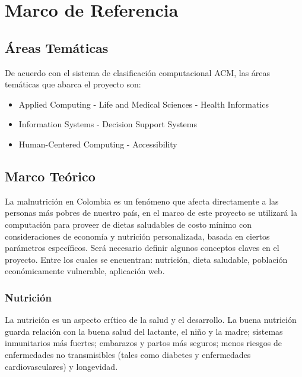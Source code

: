 \section{Marco de Referencia}
\subsection{\'Areas Tem\'aticas}

\noindent De acuerdo con el sistema de clasificaci\'on computacional ACM, las \'areas tem\'aticas que abarca el proyecto son:
\begin{itemize}
    \item  Applied Computing - Life and Medical Sciences - Health Informatics
    \item Information Systems - Decision Support Systems
    \item Human-Centered Computing - Accessibility
\end{itemize}

\subsection{Marco Te\'orico}

\noindent La malnutrici\'on en Colombia es un fen\'omeno que afecta directamente a las personas m\'as pobres de nuestro pa\'is, en el marco de este proyecto se utilizar\'a la computaci\'on para proveer de dietas saludables de costo m\'inimo con consideraciones de econom\'ia y nutrici\'on personalizada, basada en ciertos par\'ametros espec\'ificos. Ser\'a necesario definir algunos conceptos claves en el proyecto. Entre los cuales se encuentran: nutrici\'on, dieta saludable, poblaci\'on econ\'omicamente vulnerable, aplicaci\'on web.


\subsubsection{Nutrici\'on}

\noindent La nutrici\'on es un aspecto cr\'itico de la salud y el desarrollo. La buena nutrici\'on guarda relaci\'on con la buena salud del lactante, el ni\~{n}o y la madre; sistemas inmunitarios m\'as fuertes; embarazos y partos m\'as seguros; menos riesgos de enfermedades no transmisibles (tales como diabetes y enfermedades cardiovasculares) y longevidad.\cite{Nutricion}


